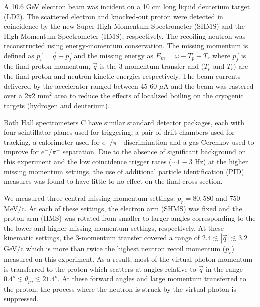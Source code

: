 A 10.6 GeV electron beam was incident on a 10 cm long liquid deuterium target (LD2). The scattered electron and knocked-out proton were detected in coincidence
by the new Super High Momentum Spectrometer (SHMS) and the High Momentum Spectrometer (HMS), respectively. The recoiling neutron was reconstructed using energy-momentum conservation. The missing momentum is defined as 
$\vec{p_{r}} = \vec{q} - \vec{p_{f}}$ and the missing  energy as $E_{m} = \omega - T_{p} - T_{r}$ where $\vec{p_{f}}$ is the final proton momentum, $\vec{q}$ is the 3-momentum transfer and $(T_{p}$ and $T_{r})$ are the
final proton and neutron kinetic energies respectively.
The beam currents delivered by the accelerator ranged between 45-60 $\mu$A and the beam was rastered over a 2x2 mm$^{2}$ area to reduce the effects of localized boiling on the cryogenic targets (hydrogen and deuterium).

Both  Hall spectrometers C have similar standard detector packages, each with four scintillator planes\cite{hodo_techreport} used for triggering, a pair of drift chambers\cite{dc_techreport} used for tracking, a calorimeter\cite{Mkrtchyan_2013} used for $e^{-}/\pi^{-}$ discrimination and a gas \u{C}erenkov \cite{Li_Wenliang_mthesis,ngc_techreport} used to improve  for $e^{-}/\pi^{-}$ separation.
Due to the absence of significant background on this experiment and the low coincidence trigger rates
($\sim 1-3$ Hz) at the higher missing momentum settings, the use of additional particle identification (PID) measures was found to have little to no effect on the final cross section.

We measured three central missing momentum settings: $p_{r}=80,580$ and $750$ MeV/c. At each of these settings, the electron arm (SHMS) was fixed and the proton arm (HMS) was rotated from smaller to larger angles corresponding to the
the lower and higher missing momentum settings, respectively. At these kinematic settings, the 3-momentum transfer covered a range of $2.4\lesssim|\vec{q}|\lesssim3.2$ GeV/c which is more than twice the highest neutron recoil momentum ($p_{r}$)
measured on this experiment. As a result, most of the virtual photon momentum is transferred to the proton which scatters at angles relative to $\vec{q}$ in the range $0.4^{o}\lesssim \theta_{pq}\lesssim21.4^{o}$.
At these forward angles and large momentum transferred to the proton, the  process where the neutron is struck by the virtual photon is suppressed.

